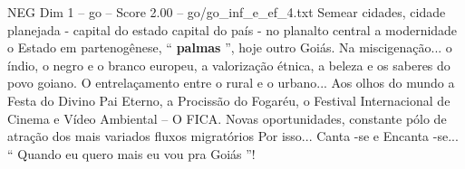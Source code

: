 \begin{textsample}{NEG Dim 1 – go – Score 2.00 – go/go\_inf\_e\_ef\_4.txt}
Semear cidades, cidade planejada - capital do estado capital do país - no planalto central a modernidade o Estado em partenogênese, “ \textbf{palmas} ”, hoje outro Goiás.
Na miscigenação... o índio, o negro e o branco europeu, a valorização étnica, a beleza e os saberes do povo goiano.
O entrelaçamento entre o rural e o urbano...
Aos olhos do mundo a Festa do Divino Pai Eterno, a Procissão do Fogaréu, o Festival Internacional de Cinema e Vídeo Ambiental – O FICA.
Novas oportunidades, constante pólo de atração dos mais variados fluxos migratórios Por isso...
Canta -se e Encanta -se... “ Quando eu quero mais eu vou pra Goiás ”!

\end{textsample}
